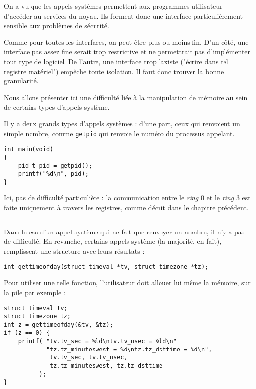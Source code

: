 On a vu que les appels systèmes permettent aux programmes utilisateur d'accéder
au services du noyau. Ils forment donc une interface particulièrement sensible aux
problèmes de sécurité.

Comme pour toutes les interfaces, on peut être plus ou moins fin. D'un
côté, une interface pas assez fine serait trop restrictive et ne permettrait pas
d'implémenter tout type de logiciel. De l'autre, une interface trop laxiste
("écrire dans tel registre matériel") empêche toute isolation. Il faut donc
trouver la bonne granularité.

Nous allons présenter ici une difficulté liée à la manipulation de mémoire au
sein de certains types d'appels système.

Il y a deux grands types d'appels systèmes : d'une part, ceux qui renvoient un
simple nombre, comme \texttt{getpid} qui renvoie le numéro du processus
appelant.

\begin{Verbatim}
int main(void)
{
    pid_t pid = getpid();
    printf("%d\n", pid);
}
\end{Verbatim}

Ici, pas de difficulté particulière : la communication entre le \emph{ring} 0 et le
\emph{ring} 3 est faite uniquement à travers les registres, comme décrit dans le
chapitre précédent.

\begin{center}\rule{3in}{0.4pt}\end{center}





Dans le cas d'un appel système qui ne fait que renvoyer un nombre, il n'y a pas
de difficulté. En revanche, certains appels système (la majorité, en fait),
remplissent une structure avec leurs résultats :

\begin{Verbatim}
int gettimeofday(struct timeval *tv, struct timezone *tz);
\end{Verbatim}

Pour utiliser une telle fonction, l'utilisateur doit allouer lui même la
mémoire, sur la pile par exemple :

\begin{Verbatim}
struct timeval tv;
struct timezone tz;
int z = gettimeofday(&tv, &tz);
if (z == 0) {
    printf( "tv.tv_sec = %ld\ntv.tv_usec = %ld\n"
            "tz.tz_minuteswest = %d\ntz.tz_dsttime = %d\n",
             tv.tv_sec, tv.tv_usec,
             tz.tz_minuteswest, tz.tz_dsttime
          );
}
\end{Verbatim}

